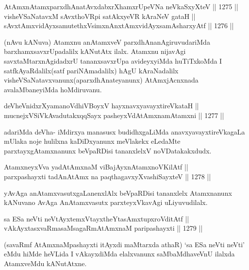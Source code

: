 \begin{shl}
AtAmx\s nAtamxparxdhAnatAvxdabxrXhamxrUpeVNa neVkaSxyXteV \hfill || 1275 ||  \\
visheVSaNatavxM sAvxthoVR\s pi satAkxyeVR kAraNeV gataH || \\
sAvxtAmxvidAyxsamutethxV\s simxnAnxtAmxvidAyxsamAsharxyAtf \hfill || 1276 ||  
\end{shl}

\begin{artha}
(nAvu kANuva) Atamxnu anAtamxveV parxdhAnanAgiruvudariMda barxhamxsavxrUpadalilx kANutAtx ilalx. Atamxnu nijavAgi savxtaMtarxnAgidadxrU tananxsavxrUpa avideyxyiMda huTiTxkoMda I satfkAyaRdalilx\break (satf pariNAmadalilx) hAgU kAraNadalilx visheVSaNatavxvanunx\break(aparxdhAnateyanunx) AtAmxjAcnxnada avalaMbaneyiMda hoMdiruvanu.
\end{artha}


\begin{shl}
deVheVnidxrXyamanoVdhiVBoyxV hayxnavxyavayxtireVkataH || \\
mucnejxVSiVkAvadutakxqqSayx pasheyxVdAtAmxnamAtamxni \hfill || 1277 ||  
\end{shl}

\begin{artha}
adariMda deVha- iMdirxya manasusx budidhxgaLiMda anavxyavayxtireVkagaLa mUlaka noje hulilxna kaDiDxyanunx meVlakekx eLedaMte parxtayxgAtamxnanunx beVpaRDisi tananxlelxV noVDatakakxdudx.
\end{artha}

\begin{shl}
AtamxneyxVva yadA\s \s tAmxnaM viBajAyxnAtamxnoV\s KilAtf || \\
parxpashayxti tadA\s nAtAmx na paqthagavxyXvashiSayxteV \hfill || 1278 ||  
\end{shl}

\begin{artha}
yAvAga anAtamxvasutxgaLanenxlAlx beVpaRDisi tananxlelx Atamxnanunx kANuvano AvAga AnAtamxvasutx parxteyxVkavAgi uLiyuvudilalx.
\end{artha}

\begin{shl}
sa ESa neVti neVtAyxtemxVtayxtheYtasAmxtupxroVditAtf || \\
vAkAyxtasxvaRmasaMsagaRmAtAmxnaM paripashayxti \hfill || 1279 || 
\end{shl}

\begin{artha}
(savaRmf AtAmxnaMpashayxti itAyxdi maMtarxda athaR) `sa ESa neVti neVti' eMdu hiMde heVLida I vAkayxdiMda elalxvanunx saMbaMdhaveVnU ilalxda AtamxveMdu kANutAtxne.
\end{artha}

